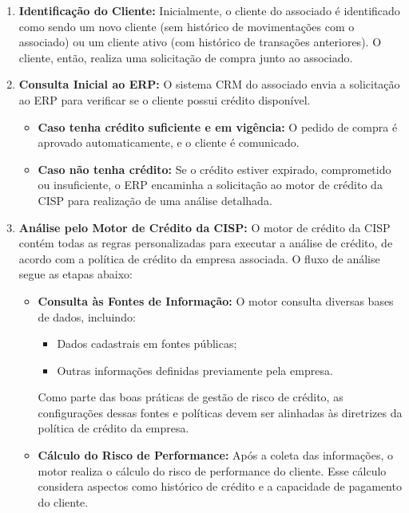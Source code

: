 \documentclass[12pt,a4paper]{article}
\begin{document}
\begin{enumerate}
    \item \textbf{Identificação do Cliente:} 
    Inicialmente, o cliente do associado é identificado como sendo um novo cliente (sem histórico de movimentações com o associado) ou um cliente ativo (com histórico de transações anteriores). O cliente, então, realiza uma solicitação de compra junto ao associado.

    \item \textbf{Consulta Inicial ao ERP:}
    O sistema CRM do associado envia a solicitação ao ERP para verificar se o cliente possui crédito disponível.
    \begin{itemize}
        \item \textbf{Caso tenha crédito suficiente e em vigência:} O pedido de compra é aprovado automaticamente, e o cliente é comunicado.
        \item \textbf{Caso não tenha crédito:} Se o crédito estiver expirado, comprometido ou insuficiente, o ERP encaminha a solicitação ao motor de crédito da CISP para realização de uma análise detalhada.
    \end{itemize}

    \item \textbf{Análise pelo Motor de Crédito da CISP:}
    O motor de crédito da CISP contém todas as regras personalizadas para executar a análise de crédito, de acordo com a política de crédito da empresa associada. O fluxo de análise segue as etapas abaixo:
    \begin{itemize}
        \item \textbf{Consulta às Fontes de Informação:}
        O motor consulta diversas bases de dados, incluindo:
        \begin{itemize}
            \item Dados cadastrais em fontes públicas;
            \item Outras informações definidas previamente pela empresa.
        \end{itemize}
        Como parte das boas práticas de gestão de risco de crédito, as configurações dessas fontes e políticas devem ser alinhadas às diretrizes da política de crédito da empresa.

        \item \textbf{Cálculo do Risco de Performance:} 
        Após a coleta das informações, o motor realiza o cálculo do risco de performance do cliente. Esse cálculo considera aspectos como histórico de crédito e a capacidade de pagamento do cliente.


\end{itemize}
\end{enumerate}
\end{document}
